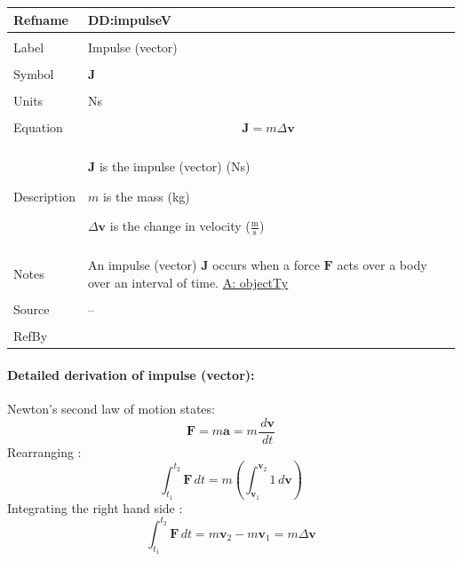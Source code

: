 \documentclass[12pt]{article}
\begin{document}
\noindent \begin{minipage}{\textwidth}
\begin{tabular}{>{\raggedright}p{}>{\raggedright\arraybackslash}p{}}
\toprule \textbf{Refname} & \textbf{DD:impulseV}
\label{DD:impulseV}
\\ \midrule \\
Label & Impulse (vector)
\\ \midrule \\
Symbol & $\mathbf{J}$
\\ \midrule \\
Units & Ns
\\ \midrule \\
Equation & \begin{displaymath}
           \mathbf{J}=m Δ\mathbf{v}
           \end{displaymath}
\\ \midrule \\
Description & \begin{symbDescription}
              \item{$\mathbf{J}$ is the impulse (vector) (Ns)}
              \item{$m$ is the mass (kg)}
              \item{$Δ\mathbf{v}$ is the change in velocity ($\frac{\text{m}}{\text{s}}$)}
              \end{symbDescription}
\\ \midrule \\
Notes & An impulse (vector) $\mathbf{J}$ occurs when a force $\mathbf{F}$ acts over a body over an interval of time.
        \hyperref[assumpOT]{A: objectTy}
\\ \midrule \\
Source & --
\\ \midrule \\
RefBy & 
\\ \bottomrule
\end{tabular}
\end{minipage}
\paragraph{Detailed derivation of impulse (vector):}
\label{DD:impulseVDeriv}
Newton's second law of motion states:
\begin{displaymath}
\mathbf{F}=m \mathbf{a}=m \frac{\,d\mathbf{v}}{\,dt}
\end{displaymath}
Rearranging :
\begin{displaymath}
\int_{{t_{1}}}^{{t_{2}}}{\mathbf{F}}\,dt=m \left(\int_{{\mathbf{v}_{1}}}^{{\mathbf{v}_{2}}}{1}\,d\mathbf{v}\right)
\end{displaymath}
Integrating the right hand side :
\begin{displaymath}
\int_{{t_{1}}}^{{t_{2}}}{\mathbf{F}}\,dt=m {\mathbf{v}_{2}}-m {\mathbf{v}_{1}}=m Δ\mathbf{v}
\end{displaymath}
\par~
\end{document}
